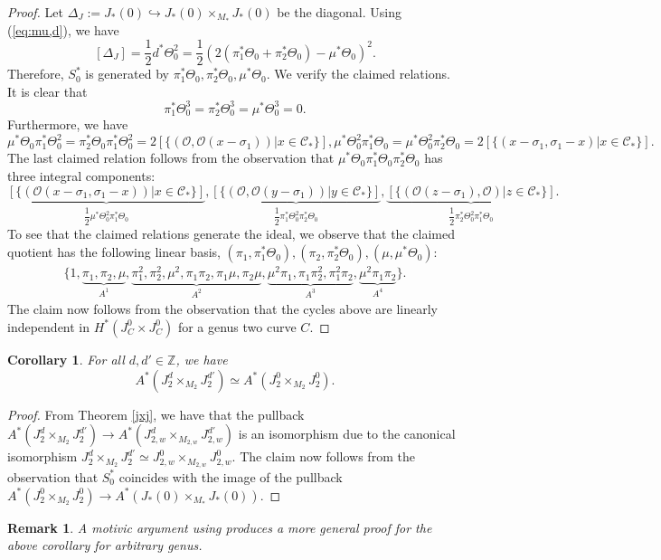 \documentclass[11pt]{amsart}
\newcommand\Z{\mathbb{Z}}
\numberwithin{theorem}{section}
\newtheorem{corollary}{Corollary}[section]
\newtheorem{rem}{Remark}
\numberwithin{lemma}{section}
\theoremstyle{definition}
\newcommand{\ri}{\rightarrow}
\newcommand{\mo}{\mathcal{O}}
\newcommand{\s}{\sigma}
\newcommand{\C}{\mathscr{C}}
\newcommand{\T}{\Theta}
\newcommand{\hr}{\hookrightarrow}
\begin{document}
\begin{proof}
Let $\Delta_J:= J_*(0)\hr J_*(0)\times_{M_*}J_*(0)$ be the diagonal. Using (\ref{eq:mu,d}), we have 
\begin{equation}\label{eq:delta-j}[\Delta_J] = \dfrac{1}{2}d^*\T_0^2 = \dfrac{1}{2}(2(\pi_1^*\T_0+\pi_2^*\T_0)-\mu^*\T_0)^2.\end{equation}
Therefore, $S_0^*$ is generated by $\pi_1^*\T_0,\pi_2^*\T_0,\mu^*\T_0$.
We verify the claimed relations. It is clear that $$\pi_1^*\T_0^3 = \pi_2^*\T_0^3=\mu^*\T_0^3 = 0.$$
Furthermore, we have $$\mu^*\T_0\pi_1^*\T_0^2 = \pi_{2}^*\T_0\pi_1^*\T_0^2 = 2[\{(\mo,\mo(x-\s_1))|x\in \C_*\}],\mu^*\T_0^2\pi_1^*\T_0 = \mu^*\T_0^2\pi_2^*\T_0 = 2[\{(x-\s_1,\s_1-x)|x\in\C_*\}].$$
The last claimed relation follows from the observation that $\mu^*\T_0\pi_1^*\T_0\pi_2^*\T_0$ has three integral components:
$$\underbrace{[\{(\mo(x-\s_1,\s_1-x))|x\in \C_*\}]}_{\dfrac{1}{2}\mu^*\T_0^2\pi_1^*\T_0},\underbrace{[\{(\mo,\mo(y-\s_1))|y\in\C_*\}]}_{\dfrac{1}{2}\pi_1^*\T_0^2\pi_2^*\T_0},\underbrace{[\{(\mo(z-\s_1),\mo)|z\in\C_*\}]}_{\dfrac{1}{2}\pi_2^*\T_0^2\pi_1^*\T_0}.$$
To see that the claimed relations generate the ideal, we observe that the claimed quotient has the following linear basis, $(\pi_1,\pi_1^*\T_0), (\pi_2,\pi_2^*\T_0),(\mu,\mu^*\T_0)$:
\begin{gather*}\{1,\underbrace{\pi_1,\pi_2,\mu}_{A^1}, \underbrace{\pi_1^2,\pi_2^2,\mu^2,\pi_1\pi_2,\pi_1\mu,\pi_2\mu}_{A^2},\underbrace{\mu^2\pi_1, \pi_1\pi_2^2,\pi_1^2\pi_2}_{A^3},\underbrace{\mu^2\pi_1\pi_2}_{A^4}\}.\end{gather*}
The claim now follows from the observation that the cycles above are linearly independent in $H^*(J^0_C\times J^0_C)$ for a genus two curve $C$.
\end{proof}
\begin{corollary}
	For all $d,d'\in\Z$, we have $$A^*(J^d_2\times_{M_2}J^{d'}_2)\simeq A^*(J^0_2\times_{M_2}J^0_2).$$
\end{corollary}
\begin{proof}
	From Theorem \ref{jxj}, we have that the pullback $A^*(J^d_2\times_{M_2}J^{d'}_2)\ri A^*(J^d_{2,w}\times_{M_{2,w}}J^{d'}_{2,w})$ is an isomorphism
due to the canonical isomorphism $J^d_2\times_{M_2}J^{d'}_2\simeq J^0_{2,w}\times_{M_{2,w}}J^0_{2,w}$. The claim now follows from the observation that $S_0^*$ coincides with the image of the pullback $A^*(J^0_2\times_{M_2}J^{0}_2)\ri A^*(J_*(0)\times_{M_*}J_*(0))$.
\end{proof}
\begin{rem}
	A motivic argument using \cite[Proposition 0.1]{bae-maulik} produces a more general proof for the above corollary for arbitrary genus.
\end{rem}
\end{document}
